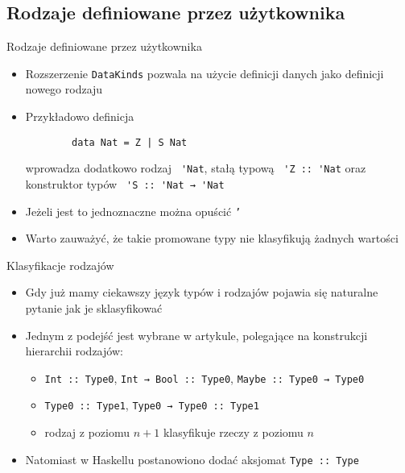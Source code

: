 \documentclass{beamer}
\begin{document}
\subsection{Rodzaje definiowane przez użytkownika}
\begin{frame}[fragile]{Rodzaje definiowane przez użytkownika}
    \begin{itemize}
      \item Rozszerzenie \lstinline!DataKinds! pozwala na użycie definicji danych jako definicji nowego rodzaju
      \item Przykładowo definicja\\
      \begin{lstlisting}
        data Nat = Z | S Nat
      \end{lstlisting}
        wprowadza dodatkowo rodzaj \lstinline! 'Nat!, stałą typową \lstinline! 'Z :: 'Nat! oraz konstruktor typów \lstinline! 'S :: 'Nat → 'Nat!
      \item Jeżeli jest to jednoznaczne można opuścić \texttt{'}
      \item Warto zauważyć, że takie promowane typy nie klasyfikują żadnych wartości
    \end{itemize}
\end{frame}


\begin{frame}[fragile]{Klasyfikacje rodzajów}
  \begin{itemize}
    \item Gdy już mamy ciekawszy język typów i rodzajów pojawia się naturalne pytanie jak je sklasyfikować
    \item Jednym z podejść jest wybrane w artykule, polegające na konstrukcji hierarchii rodzajów:
    \begin{itemize}
      \item \lstinline{Int :: Type0}, \lstinline{Int → Bool :: Type0}, \lstinline{Maybe :: Type0 → Type0}
      \item \lstinline{Type0 :: Type1}, \lstinline{Type0 → Type0 :: Type1}
      \item rodzaj z poziomu $n+1$ klasyfikuje rzeczy z poziomu $n$
    \end{itemize} 
    \item Natomiast w Haskellu postanowiono dodać aksjomat \lstinline{Type :: Type}
  \end{itemize}
\end{frame}
\end{document}
